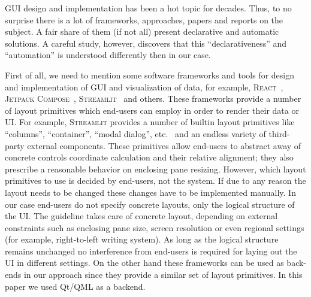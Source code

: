 
GUI design and implementation has been a hot topic for decades. Thus, to no surprise there is a lot of frameworks, approaches, papers
and reports on the subject. A fair share of them (if not all) present declarative and automatic solutions. A careful study, however,
discovers that this ``declarativeness'' and ``automation'' is understood differently then in our case.

First of all, we need to mention some software frameworks and tools for design and implementation of GUI and visualization of data, for example, \textsc{React}~\cite{react},
\textsc{Jetpack Compose}~\cite{Jetpack},%
\textsc{Streamlit}~\cite{Streamlit}%
and others.
These frameworks provide a number of layout primitives which end-users can employ in order to render their data or UI. For example, \textsc{Streamlit}
provides a number of builtin layout primitives like ``columns'', ``container'', ``modal dialog'', etc.~\cite{StreamlitLayout} and an endless
variety of third-party external components. These primitives allow end-users to abstract away of concrete controls coordinate calculation and their
relative alignment; they also prescribe a reasonable behavior on enclosing pane resizing. However, which layout primitives to use is decided by
end-users, not the system. If due to any reason the layout needs to be changed these changes have to be implemented manually. In our case
end-users do not specify concrete layouts, only the logical structure of the UI. The guideline takes care of concrete layout, depending on
external constraints such as enclosing pane size, screen resolution or even regional settings (for example, right-to-left writing system). As long
as the logical structure remains unchanged no interference from end-users is required for laying out the UI in different settings. On the
other hand these frameworks can be used as back-ends in our approach since they provide a similar set of layout primitives.
In this paper we used Qt/QML as a backend.


